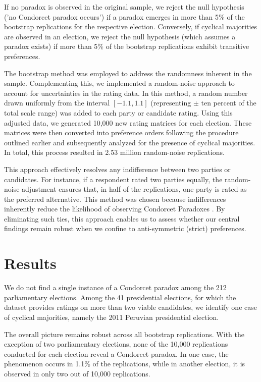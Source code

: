 \documentclass[12pt]{scrartcl}
\newcommand{\nbparliament}{212 }
\newcommand{\nbpresidential}{41 }
\begin{document}
If no paradox is observed in the original sample, we reject the null hypothesis ('no Condorcet paradox occurs') if a paradox emerges in more than 5\% of the bootstrap replications for the respective election. Conversely, if cyclical majorities are observed in an election, we reject the null hypothesis (which assumes a paradox exists) if more than 5\% of the bootstrap replications exhibit transitive preferences. 

The bootstrap method was employed to address the randomness inherent in the sample. Complementing this, we implemented a random-noise approach to account for uncertainties in the rating data. In this method, a random number drawn uniformly from the interval $[-1.1, 1.1]$ (representing $\pm$ ten percent of the total scale range) was added to each party or candidate rating. Using this adjusted data, we generated 10,000 new rating matrices for each election. These matrices were then converted into preference orders following the procedure outlined earlier and subsequently analyzed for the presence of cyclical majorities. In total, this process resulted in 2.53 million random-noise replications.

This approach effectively resolves any indifference between two parties or candidates. For instance, if a respondent rated two parties equally, the random-noise adjustment ensures that, in half of the replications, one party is rated as the preferred alternative. This method was chosen because indifferences inherently reduce the likelihood of observing Condorcet Paradoxes \citep{Lepelley2001}. By eliminating such ties, this approach enables us to assess whether our central findings remain robust when we confine to anti-symmetric (strict) preferences.

\section{Results} \label{sec.results}
We do not find a single instance of a Condorcet paradox among the \nbparliament parliamentary elections. Among the \nbpresidential presidential elections, for which the dataset provides ratings on more than two viable candidates, we identify one case of cyclical majorities, namely the 2011 Peruvian presidential election. 

The overall picture remains robust across all bootstrap replications. With the exception of two parliamentary elections, none of the 10,000 replications conducted for each election reveal a Condorcet paradox. In one case, the phenomenon occurs in 1.1\% of the replications, while in another election, it is observed in only two out of 10,000 replications.
\end{document}
